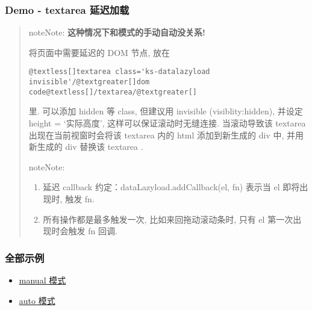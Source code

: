 \documentclass[letterpaper,10pt,english]{sphinxmanual}
\begin{document}
\subsubsection{Demo - textarea 延迟加载}
\label{demo/component/datalazyload/index:demo-textarea}\label{demo/component/datalazyload/index:component-datalazyload-demo4}\begin{quote}

\begin{notice}{note}{Note:}
\textbf{这种情况下和模式的手动自动没关系!}
\end{notice}

将页面中需要延迟的 DOM 节点, 放在

\begin{Verbatim}[commandchars=@\[\]]
@textless[]textarea class='ks-datalazyload invisible'/@textgreater[]dom code@textless[]/textarea/@textgreater[]
\end{Verbatim}

里. 可以添加 hidden 等 class, 但建议用 invisible (visiblity:hidden), 并设定 height = `实际高度', 这样可以保证滚动时无缝连接.
当滚动导致该 textarea 出现在当前视窗时会将该 textarea 内的 html 添加到新生成的 div 中, 并用新生成的 div 替换该 textarea .

\begin{notice}{note}{Note:}\begin{enumerate}
\item {}
延迟 callback 约定：dataLazyload.addCallback(el, fn) 表示当 el 即将出现时, 触发 fn.

\item {}
所有操作都是最多触发一次, 比如来回拖动滚动条时, 只有 el 第一次出现时会触发 fn 回调.

\end{enumerate}
\end{notice}
\end{quote}


\subsubsection{全部示例}
\label{demo/component/datalazyload/index:id5}\begin{itemize}
\item {}
\href{http://docs.kissyui.com/kissy/src/datalazyload/demo.html}{manual 模式}

\item {}
\href{http://docs.kissyui.com/kissy/src/datalazyload/demo-auto.html}{auto 模式}

\end{itemize}
\end{document}
